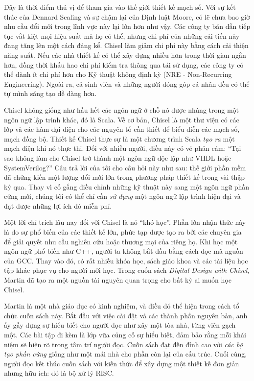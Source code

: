 \documentclass[%
    10pt,
    headinclude, footexclude,
    openright, %
    notitlepage,
    cleardoubleempty,
    headsepline,
    pointlessnumbers,
    bibtotoc, idxtotoc,
    ]{scrbook}
\begin{document}
Đây là thời điểm thú vị để tham gia vào thế giới thiết kế mạch số. Với sự kết thúc của Dennard Scaling và sự chậm lại của Định luật Moore, có lẽ chưa bao giờ nhu cầu đổi mới trong lĩnh vực này lại lớn hơn như vậy. Các công ty bán dẫn tiếp tục vắt kiệt mọi hiệu suất mà họ có thể, nhưng chi phí của những cải tiến này đang tăng lên một cách đáng kể. Chisel làm giảm chi phí này bằng cách cải thiện năng suất. Nếu các nhà thiết kế có thể xây dựng nhiều hơn trong thời gian ngắn hơn, đồng thời khấu hao chi phí kiểm tra thông qua tái sử dụng, các công ty có thể dành ít chi phí hơn cho Kỹ thuật không định kỳ (NRE - Non-Recurring Engineering). Ngoài ra, cả sinh viên và những người đóng góp cá nhân đều có thể tự mình sáng tạo dễ dàng hơn.

Chisel không giống như hầu hết các ngôn ngữ ở chỗ nó được nhúng trong một ngôn ngữ lập trình khác, đó là Scala. Về cơ bản, Chisel là một thư viện có các lớp và các hàm đại diện cho các nguyên tố cần thiết để biểu diễn các mạch số, mạch đồng bộ. Thiết kế Chisel thực sự là một chương trình Scala \emph{tạo ra} một mạch điện khi nó thực thi. Đối với nhiều người, điều này có vẻ phản cảm: ``Tại sao không làm cho Chisel trở thành một ngôn ngữ độc lập như VHDL hoặc SystemVerilog?'' Câu trả lời của tôi cho câu hỏi này như sau: thế giới phần mềm đã chứng kiến một lượng đổi mới lớn trong phương pháp thiết kế trong vài thập kỷ qua. Thay vì cố gắng điều chỉnh những kỹ thuật này sang một ngôn ngữ phần cứng mới, chúng tôi có thể chỉ cần \emph{sử dụng} một ngôn ngữ lập trình hiện đại và đạt được những lợi ích đó miễn phí. 

Một lời chỉ trích lâu nay đối với Chisel là nó ``khó học''. Phần lớn nhận thức này là do sự phổ biến của các thiết kế lớn, phức tạp được tạo ra bởi các chuyên gia để giải quyết nhu cầu nghiên cứu hoặc thương mại của riêng họ. Khi học một ngôn ngữ phổ biến như C++, người ta không bắt đầu bằng cách đọc mã nguồn của GCC. Thay vào đó, có rất nhiều khóa học, sách giáo khoa và các tài liệu học tập khác phục vụ cho người mới học. Trong cuốn sách \emph{Digital Design with Chisel}, Martin đã tạo ra một nguồn tài nguyên quan trọng cho bất kỳ ai muốn học Chisel.

Martin là một nhà giáo dục có kinh nghiệm, và điều đó thể hiện trong cách tổ chức cuốn sách này. Bắt đầu với việc cài đặt và các thành phần nguyên bản, anh ấy gầy dựng sự hiểu biết cho người đọc như xây một tòa nhà, từng viên gạch một. Các bài tập đi kèm là lớp vữa củng cố sự hiểu biết, đảm bảo rằng mỗi khái niệm sẽ hiện rõ trong tâm trí người đọc. Cuốn sách đạt đến đỉnh cao với \emph{các bộ tạo phần cứng} giống như một mái nhà cho phần còn lại của cấu trúc. Cuối cùng, người đọc kết thúc cuốn sách với kiến thức để xây dựng một thiết kế đơn giản nhưng hữu ích: đó là bộ xử lý RISC.
\end{document}
